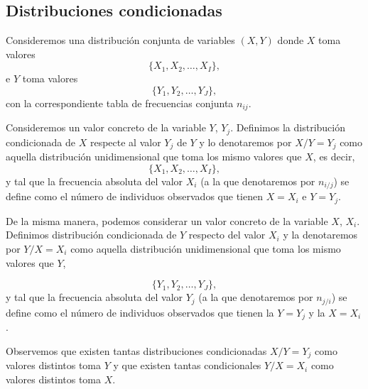 \documentclass[12pt]{report}
\begin{document}
\subsection{Distribuciones condicionadas}

Consideremos una distribución conjunta de variables $(X,Y)$ donde $X$ toma valores
$$
\{X_1,X_2,\ldots,X_I\},
$$
e $Y$ toma valores
$$
\{Y_1,Y_2,\ldots,Y_J\},
$$
con la correspondiente tabla de frecuencias conjunta   $n_{ij}$.

Consideremos un valor concreto de la variable $Y$, $Y_j$. Definimos la distribución
condicionada de $X$ respecte al valor $Y_j$ de    $Y$  y lo denotaremos por $X/Y=Y_j$
como aquella distribución unidimensional que toma los mismo valores  que $X$, es decir,
$$
\{X_1,X_2,\ldots,X_I\},
$$
y tal que la frecuencia absoluta del valor $X_i$ (a la que denotaremos por $n_{i/j}$) se
define como el número de individuos observados que tienen $X=X_i$ e $Y=Y_j$.

De la misma manera, podemos considerar un valor concreto de la variable $X$, $X_i$.
Definimos distribución condicionada de $Y$ respecto del valor  $X_i$  y la denotaremos
por
 $Y/X=X_i$ como aquella
distribución unidimensional que toma los mismo valores que $Y$,

$$
\{Y_1,Y_2,\ldots,Y_J\},
$$
y tal que la frecuencia absoluta del valor $Y_j$ (a la que denotaremos por  $n_{j/i}$) se
define como el número de individuos observados que tienen la  $Y=Y_j$ y la $X=X_i$.

Observemos que existen tantas distribuciones condicionadas $X/Y=Y_j$ como valores
distintos toma $Y$ y  que existen tantas condicionales  $Y/X=X_i$ como valores distintos
toma $X$.
\end{document}
